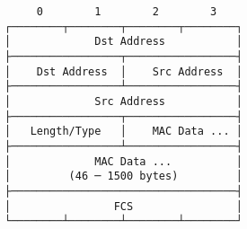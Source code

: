 \documentclass[varwidth,crop]{standalone}
\begin{document}
\begin{verbatim}
     0        1        2        3
┌────────┬────────┬────────┬────────┐
│             Dst Address           │
├─────────────────┬─────────────────┤
│    Dst Address  │    Src Address  │
├─────────────────┴─────────────────┤
│             Src Address           │
├─────────────────┬─────────────────┤
│   Length/Type   │    MAC Data ... │
├─────────────────┴─────────────────┤
│             MAC Data ...          │
│         (46 ─ 1500 bytes)         │
├───────────────────────────────────┤
│                FCS                │
└────────┴────────┴────────┴────────┘
\end{verbatim}
\end{document}
